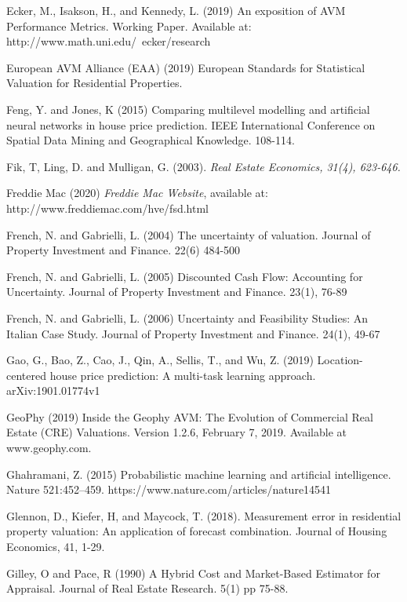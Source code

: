\documentclass[colTwo]{anon}
\theoremstyle{definition}
\begin{document}
\begin{thebibliography}{50}
\harvarditem{}{}{}Ecker, M., Isakson, H., and Kennedy, L. (2019) An exposition of AVM Performance Metrics.  Working Paper.  Available at: http://www.math.uni.edu/~ecker/research

\harvarditem{}{}{}European AVM Alliance (EAA) (2019) European Standards for Statistical Valuation for Residential Properties.

\harvarditem{}{}{}Feng, Y. and Jones, K (2015) Comparing multilevel modelling and artificial neural networks in house price prediction. IEEE International Conference on Spatial Data Mining and Geographical Knowledge. 108-114.

\harvarditem{}{}{}Fik, T, Ling, D. and Mulligan, G. (2003). \it{Real Estate Economics}, 31(4), 623-646.

\harvarditem{}{}{}Freddie Mac (2020) \textit{Freddie Mac Website}, available at: http://www.freddiemac.com/hve/fsd.html

\harvarditem{}{}{}French, N. and Gabrielli, L. (2004) The uncertainty of valuation.  Journal of Property Investment and Finance. 22(6) 484-500

\harvarditem{}{}{}French, N. and Gabrielli, L. (2005) Discounted Cash Flow: Accounting for Uncertainty.  Journal of Property Investment and Finance. 23(1), 76-89

\harvarditem{}{}{}French, N. and Gabrielli, L. (2006) Uncertainty and Feasibility Studies: An Italian Case Study.  Journal of Property Investment and Finance. 24(1), 49-67

\harvarditem{}{}{}Gao, G., Bao, Z., Cao, J., Qin, A., Sellis, T., and Wu, Z. (2019) Location-centered house price prediction: A multi-task learning approach. arXiv:1901.01774v1

\harvarditem{}{}{}GeoPhy (2019) Inside the Geophy AVM: The Evolution of Commercial Real Estate (CRE) Valuations. Version 1.2.6, February 7, 2019.  Available at www.geophy.com.

\harvarditem{}{}{}Ghahramani, Z. (2015) Probabilistic machine learning and artificial intelligence. Nature 521:452–459. https://www.nature.com/articles/nature14541

\harvarditem{}{}{}Glennon, D., Kiefer, H, and Maycock, T. (2018). Measurement error in residential property valuation: An application of forecast combination. Journal of Housing Economics, 41, 1-29.

\harvarditem{}{}{}Gilley, O and Pace, R (1990) A Hybrid Cost and Market-Based Estimator for Appraisal. Journal of Real Estate Research. 5(1) pp 75-88.


\end{thebibliography}
\end{document}
